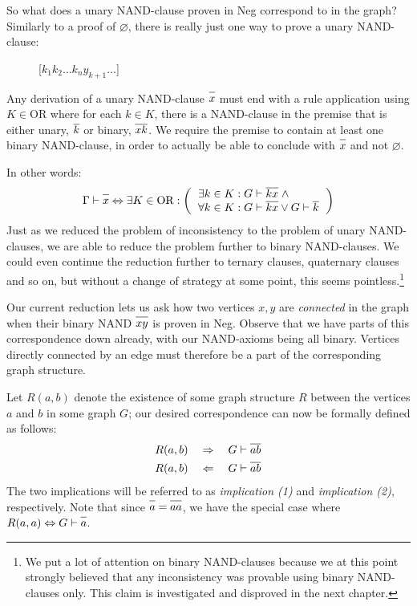 So what does a unary NAND-clause proven in Neg correspond to in the graph?
Similarly to a proof of $\varnothing$, there is really just one way to prove a unary NAND-clause:\par
\begin{figure}[!h]
  \centering
  \begin{prooftree*}
    \Hypo{\dots}
    \Hypo{\dots}
    [$k_1k_2\dots k_ny_{k+1}\dots$]{}
  \end{prooftree*}
  \caption{}
  \label{fig:proof_unary_nand}
\end{figure}
Any derivation of a unary NAND-clause $\ol{x}$ must end with a rule application using $K \in \text{OR}$ where for each $k \in K$, there is a NAND-clause in the premise that is either unary, $\ol{k}$ or binary, $\ol{xk}$.
We require the premise to contain at least one binary NAND-clause, in order to actually be able to conclude with $\ol x$ and not $\varnothing$.

In other words:
\begin{align}
  \Gamma \vdash \ol{x} \Leftrightarrow \exists K \in \text{OR}:
  \left ( \begin{tabular}{l}
  $\exists k \in K: G \vdash \ol{kx} \; \wedge$\\
  $\forall k \in K: G \vdash \ol{kx} \vee G \vdash \ol{k}$
  \end{tabular} \right )
\end{align}
Just as we reduced the problem of inconsistency to the problem of unary NAND-clauses, we are able to reduce the problem further to binary NAND-clauses.
We could even continue the reduction further to ternary clauses, quaternary clauses and so on, but without a change of strategy at some point, this seems pointless.\footnote{We put a lot of attention on binary NAND-clauses because we at this point strongly believed that any inconsistency was provable using binary NAND-clauses only.
This claim is investigated and disproved in the next chapter.}

Our current reduction lets us ask how two vertices $x,y$ are \textit{connected} in the graph when their binary NAND $\ol{xy}$ is proven in Neg.
Observe that we have parts of this correspondence down already, with our NAND-axioms being all binary.
Vertices directly connected by an edge must therefore be a part of the corresponding graph structure.

Let $R(a,b)$ denote the existence of some graph structure $R$ between the vertices $a$ and $b$ in some graph $G$; our desired correspondence can now be formally defined as follows:
\begin{align}
  R(a,b) \quad \Rightarrow \quad G \vdash \ol{ab}\\
  R(a,b) \quad \Leftarrow \quad G \vdash \ol{ab}
\end{align}
The two implications will be referred to as \textit{implication (1)} and \textit{implication (2)}, respectively.
Note that since $\ol{a} = \ol{aa}$, we have the special case where $R(a,a) \Leftrightarrow G \vdash \ol{a}$.

